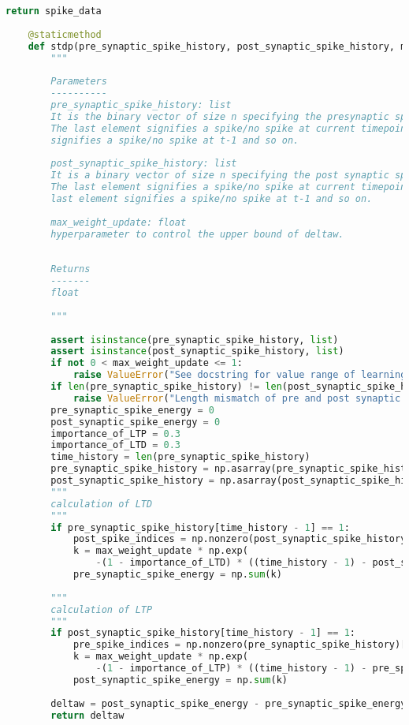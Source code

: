 \begin{lstlisting}[language=Python, caption={Python code for modular implementation of SNNc}]
		return spike_data
	
	@staticmethod
	def stdp(pre_synaptic_spike_history, post_synaptic_spike_history, max_weight_update):
		"""
	
		Parameters
		----------
		pre_synaptic_spike_history: list
		It is the binary vector of size n specifying the presynaptic spike history of the neuron.
		The last element signifies a spike/no spike at current timepoint t, second last element
		signifies a spike/no spike at t-1 and so on.
	
		post_synaptic_spike_history: list
		It is a binary vector of size n specifying the post synaptic spike history.
		The last element signifies a spike/no spike at current timepoint t, second
		last element signifies a spike/no spike at t-1 and so on.
	
		max_weight_update: float
		hyperparameter to control the upper bound of deltaw.
	
	
		Returns
		-------
		float
		
		"""
	
		assert isinstance(pre_synaptic_spike_history, list)
		assert isinstance(post_synaptic_spike_history, list)
		if not 0 < max_weight_update <= 1:
			raise ValueError("See docstring for value range of learning_rate")
		if len(pre_synaptic_spike_history) != len(post_synaptic_spike_history):
			raise ValueError("Length mismatch of pre and post synaptic spike history!!")
		pre_synaptic_spike_energy = 0
		post_synaptic_spike_energy = 0
		importance_of_LTP = 0.3
		importance_of_LTD = 0.3
		time_history = len(pre_synaptic_spike_history)
		pre_synaptic_spike_history = np.asarray(pre_synaptic_spike_history)
		post_synaptic_spike_history = np.asarray(post_synaptic_spike_history)
		"""
		calculation of LTD
		"""
		if pre_synaptic_spike_history[time_history - 1] == 1:
			post_spike_indices = np.nonzero(post_synaptic_spike_history)[0]
			k = max_weight_update * np.exp(
				-(1 - importance_of_LTD) * ((time_history - 1) - post_spike_indices))
			pre_synaptic_spike_energy = np.sum(k)
	
		"""
		calculation of LTP
		"""
		if post_synaptic_spike_history[time_history - 1] == 1:
			pre_spike_indices = np.nonzero(pre_synaptic_spike_history)[0]
			k = max_weight_update * np.exp(
				-(1 - importance_of_LTP) * ((time_history - 1) - pre_spike_indices))
			post_synaptic_spike_energy = np.sum(k)
	
		deltaw = post_synaptic_spike_energy - pre_synaptic_spike_energy
		return deltaw
	
	
\end{lstlisting}
